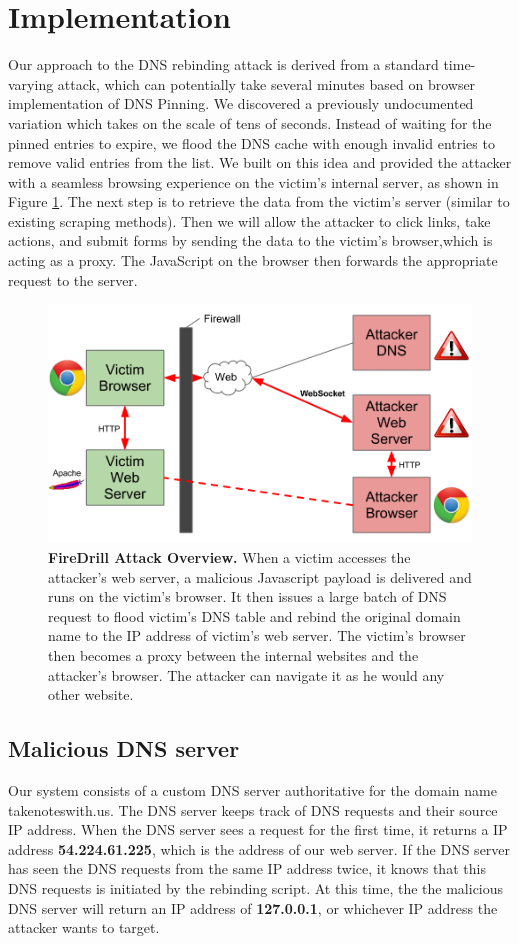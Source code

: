 \section{Implementation}
\label{sec:impl}
Our approach to the DNS rebinding attack is derived from a standard time-varying attack, which can potentially take several minutes based on browser implementation of DNS Pinning. We discovered a previously undocumented variation which takes on the scale of tens of seconds. Instead of waiting for the pinned entries to expire, we flood the DNS cache with enough invalid entries to remove valid entries from the list. We built on this idea and provided the attacker with a seamless browsing experience on the victim's internal server, as shown in Figure \ref{fig:firedrill1}. The next step is to retrieve the data from the victim's server (similar to existing scraping methods). Then we will allow the attacker to click links, take actions, and submit forms by sending the data to the victim's browser,which is acting as a proxy. The JavaScript on the browser then forwards the appropriate request to the server.

\begin{figure}[h]
\centering
\includegraphics[width=0.8\columnwidth]{firedrill1.png}
\caption{\textbf{FireDrill Attack Overview.} When a victim accesses the attacker's web server, a malicious Javascript payload is delivered and runs on the victim's browser. It then issues a large batch of DNS request to flood victim's DNS table and rebind the original domain name to the IP address of victim's web server. The victim's browser then becomes a proxy between the internal websites and the attacker's browser. The attacker can navigate it as he would any other website.}
\label{fig:firedrill1}
\end{figure}

\subsection{Malicious DNS server}
Our system consists of a custom DNS server authoritative for the domain name takenoteswith.us. The DNS server keeps track of DNS requests and their source IP address. When the DNS server sees a request for the first time, it returns a IP address \textbf{54.224.61.225}, which is the address of our web server. If the DNS server has seen the DNS requests from the same IP address twice, it knows that this DNS requests is initiated by the rebinding script. At this time, the the malicious DNS server will return an IP address of \textbf{127.0.0.1}, or whichever IP address the attacker wants to target.

